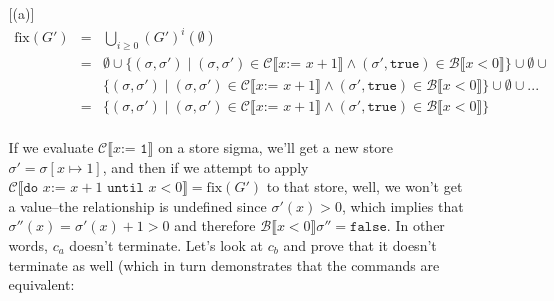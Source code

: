 \documentclass[10pt, oneside]{article}
\begin{document}
\begin{enumerate}[1.]
\begin{enumerate} [(a)]
			\begin{eqnarray*}
			  \text{fix}(G') & = & \bigcup_{i \geq 0} (G')^{i}(\emptyset) \\
			  & = & \emptyset \cup \{ (\sigma, \sigma') \mid (\sigma, \sigma') \in \mathcal{C} \llbracket x \texttt{:= } x + 1 \rrbracket \wedge (\sigma', \texttt{true}) \in \mathcal{B} \llbracket x < 0 \rrbracket \} \cup \emptyset \cup\\
			  & & \{ (\sigma, \sigma') \mid (\sigma, \sigma') \in \mathcal{C} \llbracket x \texttt{:= } x + 1 \rrbracket \wedge (\sigma', \texttt{true}) \in \mathcal{B} \llbracket x < 0 \rrbracket \} \cup \emptyset \cup ... \\
			  & = & \{ (\sigma, \sigma') \mid (\sigma, \sigma') \in \mathcal{C} \llbracket x \texttt{:= } x + 1 \rrbracket \wedge (\sigma', \texttt{true}) \in \mathcal{B} \llbracket x < 0 \rrbracket \} \\
			\end{eqnarray*}
			
			If we evaluate $\mathcal{C} \llbracket x \texttt{:= 1} \rrbracket$ on a store
			sigma, we'll get a new store $\sigma' = \sigma[x\mapsto 1]$, and then if we 
			attempt to apply  $\mathcal{C} \llbracket \texttt{do } x \texttt{:= } x + 1 
			\texttt{ until } x < 0 \rrbracket  =  \text{fix}(G')$ to that store, well, 
			we won't get a value--the relationship is undefined since $\sigma'(x) > 
			0$, which implies that $\sigma''(x) = \sigma'(x) + 1 > 0$ and therefore $
			\mathcal{B}\llbracket x < 0 \rrbracket \sigma'' = \texttt{false}$. In other 
			words, $c_a$ doesn't terminate. Let's look at $c_b$ and prove that it doesn't 
			terminate as well (which in turn demonstrates that the commands are 
			equivalent:
			

\end{enumerate}
\end{enumerate}
\end{document}
